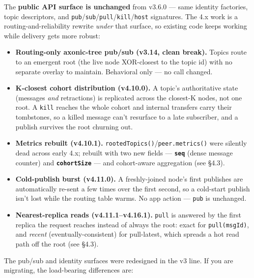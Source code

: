 \documentclass[
  nobib]{tufte-handout}
\providecommand{\tightlist}{%
  \setlength{\itemsep}{0pt}\setlength{\parskip}{0pt}}
\renewcommand{\subsubsection}[1]{\medskip\par\noindent{\normalsize\bfseries #1}\par\nobreak\smallskip}
\begin{document}
The \textbf{public API surface is unchanged} from v3.6.0 --- same
identity factories, topic descriptors, and
\texttt{pub}/\texttt{sub}/\texttt{pull}/\texttt{kill}/\texttt{host}
signatures. The 4.x work is a routing-and-reliability rewrite
\emph{under} that surface, so existing code keeps working while delivery
gets more robust:

\begin{itemize}
\tightlist
\item
  \textbf{Routing-only axonic-tree pub/sub (v3.14, clean break).} Topics
  route to an emergent root (the live node XOR-closest to the topic id)
  with no separate overlay to maintain. Behavioral only --- no call
  changed.
\item
  \textbf{K-closest cohort distribution (v4.10.0).} A topic's
  authoritative state (messages \emph{and} retractions) is replicated
  across the closest-K nodes, not one root. A \texttt{kill} reaches the
  whole cohort and internal transfers carry their tombstones, so a
  killed message can't resurface to a late subscriber, and a publish
  survives the root churning out.
\item
  \textbf{Metrics rebuilt (v4.10.1).}
  \texttt{rootedTopics()}/\texttt{peer.metrics()} were silently dead
  across early 4.x; rebuilt with two new fields ---
  \textbf{\texttt{seq}} (dense message counter) and
  \textbf{\texttt{cohortSize}} --- and cohort-aware aggregation (see
  §4.3).
\item
  \textbf{Cold-publish burst (v4.11.0).} A freshly-joined node's first
  publishes are automatically re-sent a few times over the first second,
  so a cold-start publish isn't lost while the routing table warms. No
  app action --- \texttt{pub} is unchanged.
\item
  \textbf{Nearest-replica reads (v4.11.1--v4.16.1).} \texttt{pull} is
  answered by the first replica the request reaches instead of always
  the root: exact for \texttt{pull(msgId)}, and \emph{recent}
  (eventually-consistent) for pull-latest, which spreads a hot read path
  off the root (see §4.3).
\end{itemize}

\subsubsection{What changed since v2.x}\label{what-changed-since-v2.x}

The pub/sub and identity surfaces were redesigned in the v3 line. If you
are migrating, the load-bearing differences are:
\end{document}
